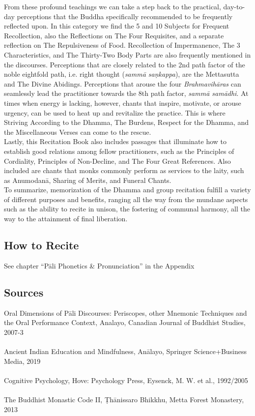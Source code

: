 From these profound teachings we can take a step back to the practical, day-to-day perceptions that the Buddha specifically recommended to be frequently reflected upon. In this category we find the 5 and 10 Subjects for Frequent Recollection, also the Reflections on The Four Requisites, and a separate reflection on The Repulsiveness of Food. Recollection of Impermanence, The 3 Characteristics, and The Thirty-Two Body Parts are also frequently mentioned in the discourses. Perceptions that are closely related to the 2nd path factor of the noble eightfold path, i.e. right thought (\textit{sammā saṇkappa}), are the Mettasutta and The Divine Abidings. Perceptions that arouse the four \textit{Brahmavihāras} can seamlessly lead the practitioner towards the 8th path factor, \textit{sammā samādhi}. At times when energy is lacking, however, chants that inspire, motivate, or arouse urgency, can be used to heat up and revitalize the practice. This is where Striving According to the Dhamma, The Burdens, Respect for the Dhamma, and the Miscellaneous Verses can come to the rescue.\\

Lastly, this Recitation Book also includes passages that illuminate how to establish good relations among fellow practitioners, such as the Principles of Cordiality, Principles of Non-Decline, and The Four Great References. Also included are chants that monks commonly perform as services to the laity, such as Anumodanā, Sharing of Merits, and Funeral Chants.\\

To summarize, memorization of the Dhamma and group recitation fulfill a variety of different purposes and benefits, ranging all the way from the mundane aspects such as the ability to recite in unison, the fostering of communal harmony, all the way to the attainment of final liberation.\\

\subsection{How to Recite}

See chapter “Pāli Phonetics \& Pronunciation” in the Appendix\\

\subsection{Sources}
Oral Dimensions of Pāli Discourses: Periscopes, other Mnemonic Techniques and the Oral Performance Context, Analayo, Canadian Journal of Buddhist Studies, 2007-3\\
\\
Ancient Indian Education and Mindfulness, Anālayo, Springer Science+Business Media, 2019\\
\\
Cognitive Psychology, Hove: Psychology Press, Eysenck, M. W. et al., 1992/2005\\
\\
The Buddhist Monastic Code II, Ṭhānissaro Bhikkhu, Metta Forest Monastery, 2013
